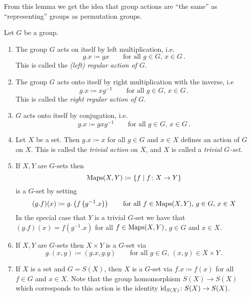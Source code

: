 From this lemma we get the idea that group actions are ``the same'' as ``representing'' groups as permutation groups.


\begin{expls}
  Let $G$ be a group.
  \begin{enumerate}[label=\emph{\alph*)},leftmargin=*]
    \item
      The group $G$ acts on itself by left multiplication, i.e.\
      \[
                  g.x
        \coloneqq gx
        \qquad
        \text{for all $g \in G$, $x \in G$} \,.
      \]
      This is called the \emph{\textup(left\textup) regular action of $G$}.
    \item
      The group $G$ acts onto itself by right multiplication with the inverse, i.e\
      \[
                  g.x
        \coloneqq xg^{-1}
        \qquad
        \text{for all $g \in G$, $x \in G$} \,.
      \]
      This is called the \emph{right regular action of $G$}.
    \item
      $G$ acts onto itself by conjugation, i.e.\
      \[
                  g.x
        \coloneqq gxg^{-1}
        \qquad
        \text{for all $g \in G$, $x \in G$} \,.
      \]
    \item
      Let $X$ be a set.
      Then $g.x \coloneqq x$ for all $g \in G$ and $x \in X$ defines an action of $G$ on $X$.
      This is called the \emph{trivial action} on $X$, and $X$ is called a \emph{trivial $G$-set}.
    \item
      If $X, Y$ are $G$-sets then
      \[
                  \operatorname{Maps}(X,Y)
        \coloneqq \{
                    f
                  \mid
                    f \colon X \to Y
                  \}
      \]
      is a $G$-set by setting
      \[
                  (g.f)(x)
        \coloneqq g.\left( f\left( g^{-1}.x \right) \right)
        \qquad
        \text{for all $f \in \operatorname{Maps}(X,Y)$, $g \in G$, $x \in X$}
      \]
      In the special case that $Y$ is a trivial $G$-set we have that $(g.f)(x) = f(g^{-1}.x)$ for all $f \in \operatorname{Maps}(X,Y)$, $g \in G$ and $x \in X$.
    \item
      If $X, Y$ are $G$-sets then $X \times Y$ is a $G$-set via
      \[
                  g.(x,y)
        \coloneqq (g.x,g.y)
        \qquad
        \text{for all $g \in G$, $(x,y) \in X \times Y$} \,.
      \]
    \item
      If $X$ is a set and $G = S(X)$, then $X$ is a $G$-set via $f.x \coloneqq f(x)$ for all $f \in G$ and $x \in X$.
      Note that the group homomorphism $S(X) \to S(X)$ which corresponds to this action is the identity $\operatorname{id}_{S(X)} \colon S(X) \to S(X)$.
  \end{enumerate}
\end{expls}


